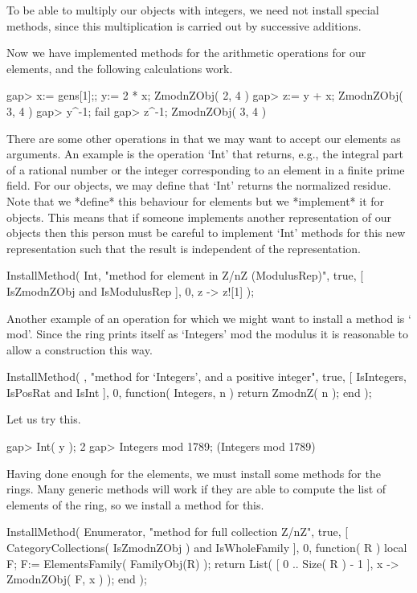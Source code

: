 To be able to multiply our objects with integers,
we need not install special methods,
since this multiplication is carried out by successive additions.

Now we have implemented methods for the arithmetic operations for our
elements, and the following calculations work.

\begintt
    gap> x:= gens[1];; y:= 2 * x;
    ZmodnZObj( 2, 4 )
    gap> z:= y + x;
    ZmodnZObj( 3, 4 )
    gap> y^-1;
    fail
    gap> z^-1;
    ZmodnZObj( 3, 4 )
\endtt

There are some other operations in {\GAP} that we may want to accept
our elements as arguments.
An example is the operation `Int' that returns, e.g.,
the integral part of a rational number or the integer corresponding to
an element in a finite prime field.
For our objects, we may define that `Int' returns the normalized residue.
Note that we *define* this behaviour for elements
but we *implement* it for objects.
This means that if someone implements another representation of our
objects then this person must be careful to implement `Int' methods for
this new representation such that the result is independent of the
representation.

\begintt
    InstallMethod( Int,
        "method for element in Z/nZ (ModulusRep)",
        true,
        [ IsZmodnZObj and IsModulusRep ], 0,
        z -> z![1] );
\endtt

Another example of an operation for which we might want to install
a method is `\\mod'.
Since the ring prints itself as `Integers' mod the modulus
it is reasonable to allow a construction this way.

\begintt
    InstallMethod( \mod,
        "method for `Integers', and a positive integer",
        true,
        [ IsIntegers, IsPosRat and IsInt ], 0,
        function( Integers, n ) return ZmodnZ( n ); end );
\endtt

Let us try this.

\begintt
    gap> Int( y );
    2
    gap> Integers mod 1789;
    (Integers mod 1789)
\endtt

Having done enough for the elements,
we must install some methods for the rings.
Many generic methods will work if they are able to compute the
list of elements of the ring,
so we install a method for this.

\begintt
    InstallMethod( Enumerator,
        "method for full collection Z/nZ",
        true,
        [ CategoryCollections( IsZmodnZObj ) and IsWholeFamily ], 0,
        function( R )
        local F;
        F:= ElementsFamily( FamilyObj(R) );
        return List( [ 0 .. Size( R ) - 1 ], x -> ZmodnZObj( F, x ) );
        end );
\endtt

